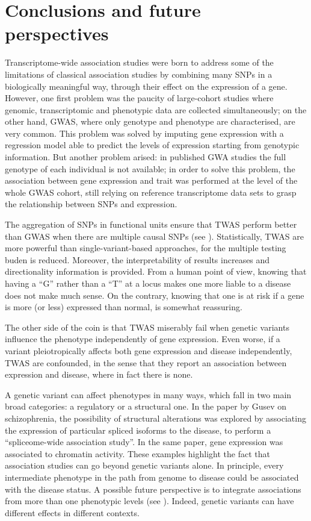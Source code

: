 \documentclass[../main.tex]{subfiles}
\begin{document}
\chapter{Conclusions and future perspectives}

Transcriptome-wide association studies were born to address some of the 
limitations of classical association studies by combining many SNPs in a 
biologically meaningful way, \ie through their effect on the expression 
of a gene. However, one first problem was the paucity of large-cohort 
studies where genomic, transcriptomic and phenotypic data are collected 
simultaneously; on the other hand, GWAS, where only genotype and 
phenotype are characterised, are very common. This problem was solved by 
imputing gene expression with a regression model able to predict the 
levels of expression starting from genotypic information. But another 
problem arised: in published GWA studies the full genotype of each 
individual is not available; in order to solve this problem, the 
association between gene expression and trait was performed at the level 
of the whole GWAS cohort, still relying on reference transcriptome data 
sets to grasp the relationship between SNPs and expression.

The aggregation of SNPs in functional units ensure that TWAS perform 
better than GWAS when there are multiple causal SNPs (see 
). Statistically, TWAS are more powerful 
than single-variant-based approaches, for the multiple testing buden is 
reduced. Moreover, the interpretability of results increases and 
directionality information is provided. From a human point of view, 
knowing that having a \enquote{G} rather than a \enquote{T} at a locus 
makes one more liable to a disease does not make much sense. On the 
contrary, knowing that one is at risk if a gene is more (or less) 
expressed than normal, is somewhat reassuring.

The other side of the coin is that TWAS miserably fail when genetic 
variants influence the phenotype independently of gene expression. Even 
worse, if a variant pleiotropically affects both gene expression and 
disease independently, TWAS are confounded, in the sense that they 
report an association between expression and disease, where in fact 
there is none.

A genetic variant can affect phenotypes in many ways, which fall in two 
main broad categories: a regulatory or a structural one. In the paper by 
Gusev \etal on schizophrenia, the possibility of structural alterations 
was explored by associating the expression of particular spliced 
isoforms to the disease, to perform a \enquote{spliceome-wide 
	association study}. In the same paper, gene expression was 
associated to chromatin activity. These examples highlight the fact that 
association studies can go beyond genetic variants alone. In principle, 
every intermediate phenotype in the path from genome to disease could be 
associated with the disease status. A possible future perspective is to 
integrate associations from more than one phenotypic levels (see 
). Indeed, genetic variants can have different 
effects in different contexts.
\end{document}
